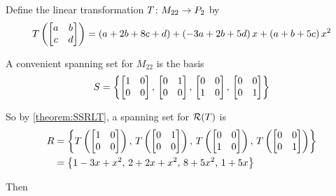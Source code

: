 \documentclass{ximera}
\begin{document}
\begin{example}

Define the linear transformation $T\colon M_{22}\rightarrow P_2$ by
\[
T\left( \begin{bmatrix} a&b\\c&d \end{bmatrix}\right)
=\left(a+2b+8c+d\right)+\left(-3a+2b+5d\right)x+\left(a+b+5c\right)x^2
\]




A convenient spanning set for $M_{22}$ is the basis
\[
S=\left\{
\begin{bmatrix} 1 & 0 \\ 0 & 0 \end{bmatrix},\,
\begin{bmatrix} 0 & 1 \\ 0 & 0 \end{bmatrix},\,
\begin{bmatrix} 0 & 0 \\ 1 & 0 \end{bmatrix},\,
\begin{bmatrix} 0 & 0 \\ 0 & 1 \end{bmatrix}
\right\}
\]




So by \ref{theorem:SSRLT}, a spanning set for $\mathcal{R}\!\left(T\right)$ is
\begin{align*}
R
&=\left\{
T\left(\begin{bmatrix} 1 & 0 \\ 0 & 0 \end{bmatrix}\right),\,
T\left(\begin{bmatrix} 0 & 1 \\ 0 & 0 \end{bmatrix}\right),\,
T\left(\begin{bmatrix} 0 & 0 \\ 1 & 0 \end{bmatrix}\right),\,
T\left(\begin{bmatrix} 0 & 0 \\ 0 & 1 \end{bmatrix}\right)
\right\}\\
&=\left\{1-3x+x^2,\,2+2x+x^2,\,8+5x^2,\,1+5x\right\}
\end{align*}

Then
\begin{multipleChoice}
\end{multipleChoice}


\end{example}
\end{document}
